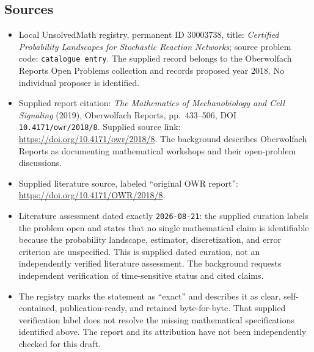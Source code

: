 \documentclass[11pt]{article}
\begin{document}
\subsection{Sources}
\begin{itemize}
\item Local UnsolvedMath registry, permanent ID \(30003738\), title: \emph{Certified Probability Landscapes for Stochastic Reaction Networks}; source problem code: \texttt{catalogue entry}. The supplied record belongs to the Oberwolfach Reports Open Problems collection and records proposed year 2018. No individual proposer is identified.
\item Supplied report citation: \emph{The Mathematics of Mechanobiology and Cell Signaling} (2019), Oberwolfach Reports, pp.\ 433--506, DOI \texttt{10.4171/owr/2018/8}. Supplied source link: \url{https://doi.org/10.4171/owr/2018/8}. The background describes Oberwolfach Reports as documenting mathematical workshops and their open-problem discussions.
\item Supplied literature source, labeled ``original OWR report'': \url{https://doi.org/10.4171/OWR/2018/8}.
\item Literature assessment dated exactly \texttt{2026-08-21}: the supplied curation labels the problem open and states that no single mathematical claim is identifiable because the probability landscape, estimator, discretization, and error criterion are unspecified. This is supplied dated curation, not an independently verified literature assessment. The background requests independent verification of time-sensitive status and cited claims.
\item The registry marks the statement as ``exact'' and describes it as clear, self-contained, publication-ready, and retained byte-for-byte. That supplied verification label does not resolve the missing mathematical specifications identified above. The report and its attribution have not been independently checked for this draft.
\end{itemize}
\end{document}
